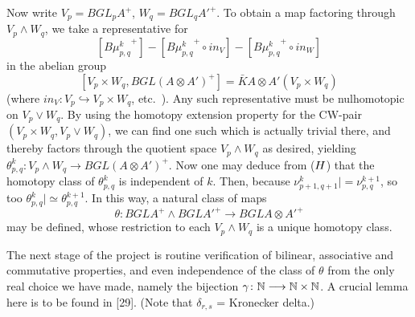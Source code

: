 Now write $V_p = BGL_pA^+$, $W_q = BGL_q{A'}^+$. To obtain a map factoring through $V_p \wedge W_q$, we take a representative for
\[[{B\mu_{p,q}^k}^+]- [{B\mu_{p,q}^k}^+\circ in_V] - [{B\mu_{p,q}^k}^+\circ in_W]\]
in the abelian group
\[[V_p \times W_q, BGL(A \otimes A')^+] = \bar{K}A \otimes A'(V_p \times W_q)\]
(where $in_V\colon   V_p \hookrightarrow V_p \times W_q$, etc.\ ). Any such representative must be nulhomotopic on $V_p \vee W_q$. By using the homotopy extension property for the CW-pair $(V_p \times W_q, V_p \vee W_q)$, we can find one such which is actually trivial there, and thereby factors through the quotient space $V_p \wedge W_q$ as desired, yielding $\theta_{p,q}^k\colon  V_p \wedge W_q \longrightarrow BGL(A \otimes A')^+$. Now one may deduce from ($\ding{72}$) that the homotopy class of $\theta_{p,q}^k$ is independent of $k$. Then, because $\nu_{p+1,q+1}^{k}|= \nu_{p,q}^{k+1}$, so too
$\theta_{p,q}^k| \simeq \theta_{p,q}^{k+1}$. In this way, a natural class of maps
\[\theta \colon  BGLA^+ \wedge {BGLA'}^+ \longrightarrow {BGLA \otimes A'}^+\]
may be defined, whose restriction to each $V_p \wedge W_q$ is a unique homotopy class.

The next stage of the project is routine verification of bilinear, associative and commutative properties, and even independence of the class of $\theta$ from the only real choice we have made, namely the bijection $\gamma\colon  \mathbb{N} \longrightarrow \mathbb{N} \times \mathbb{N}$. A crucial lemma here is to be found in [29]. (Note that $\delta_{r,s}$ = Kronecker delta.)

